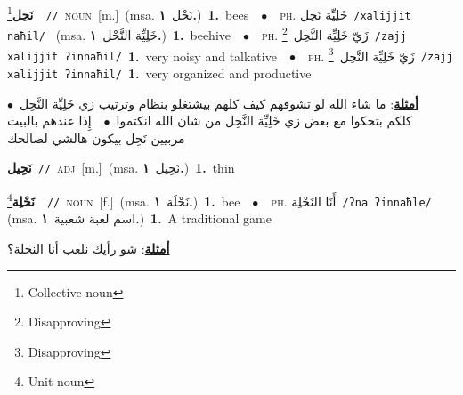 \documentclass[10pt,a4paper,twoside]{article} %
\begin{document}
\begin{multicols}{2}
{\setlength\topsep{0pt}\textbf{\foreignlanguage{arabic}{نَحِل}}\footnote{Collective noun}\ \ {\color{gray}\texttt{//}\color{black}}\ \textsc{noun}\ [m.]\ \color{gray}(msa. \foreignlanguage{arabic}{نَحْل}~\foreignlanguage{arabic}{\textbf{١.}})\color{black}\ \textbf{1.}~bees\ \ $\bullet$\ \ \textsc{ph.} \color{gray} \foreignlanguage{arabic}{خَلِيِّة نَحِل}\color{black}\ {\color{gray}\texttt{/{\sffamily xalijjit naħil}/}\color{black}}\ \color{gray} (msa. \foreignlanguage{arabic}{خَلِيِّة النَّحْل}~\foreignlanguage{arabic}{\textbf{١.}})\color{black}\ \textbf{1.}~beehive\ \ $\bullet$\ \ \textsc{ph.} \color{gray} \foreignlanguage{arabic}{زَيّ خَلِيِّة النَّحِل}\color{black}\ \footnote{Disapproving}\ {\color{gray}\texttt{/{\sffamily zajj xalijjit ʔinnaħil}/}\color{black}}\ \textbf{1.}~very noisy and talkative\ \ $\bullet$\ \ \textsc{ph.} \color{gray} \foreignlanguage{arabic}{زَيّ خَلِيِّة النَّحِل}\color{black}\ \footnote{Disapproving}\ {\color{gray}\texttt{/{\sffamily zajj xalijjit ʔinnaħil}/}\color{black}}\ \textbf{1.}~very organized and productive\  \begin{flushright}\color{gray}\foreignlanguage{arabic}{\textbf{\underline{\foreignlanguage{arabic}{أمثلة}}}: ما شاء الله لو تشوفهم كيف كلهم بيشتغلو بنظام وترتيب زي خَلِيِّة النَّحِل\ $\bullet$\ \  كلكم بتحكوا مع بعض زي خَلِيِّة النَّحِل من شان الله انكتموا\ $\bullet$\ \  إِذا عندهم بالبيت مربيين نَحِل بيكون هالشي لصالحك}\end{flushright}\color{black}} \vspace{2mm}

{\setlength\topsep{0pt}\textbf{\foreignlanguage{arabic}{نَحِيل}}\ {\color{gray}\texttt{//}\color{black}}\ \textsc{adj}\ [m.]\ \color{gray}(msa. \foreignlanguage{arabic}{نَحِيل}~\foreignlanguage{arabic}{\textbf{١.}})\color{black}\ \textbf{1.}~thin\ } \vspace{2mm}

{\setlength\topsep{0pt}\textbf{\foreignlanguage{arabic}{نَحْلِة}}\footnote{Unit noun}\ \ {\color{gray}\texttt{//}\color{black}}\ \textsc{noun}\ [f.]\ \color{gray}(msa. \foreignlanguage{arabic}{نَحْلَة}~\foreignlanguage{arabic}{\textbf{١.}})\color{black}\ \textbf{1.}~bee\ \ $\bullet$\ \ \textsc{ph.} \color{gray} \foreignlanguage{arabic}{أَنَا النَحْلِة}\color{black}\ {\color{gray}\texttt{/{\sffamily ʔna ʔinnaħle}/}\color{black}}\ \color{gray} (msa. \foreignlanguage{arabic}{اسم لعبة شعبية}~\foreignlanguage{arabic}{\textbf{١.}})\color{black}\ \textbf{1.}~A traditional game\  \begin{flushright}\color{gray}\foreignlanguage{arabic}{\textbf{\underline{\foreignlanguage{arabic}{أمثلة}}}: شو رأيك نلعب أنا النحلة؟}\end{flushright}\color{black}} \vspace{2mm}


\end{multicols}
\end{document}
